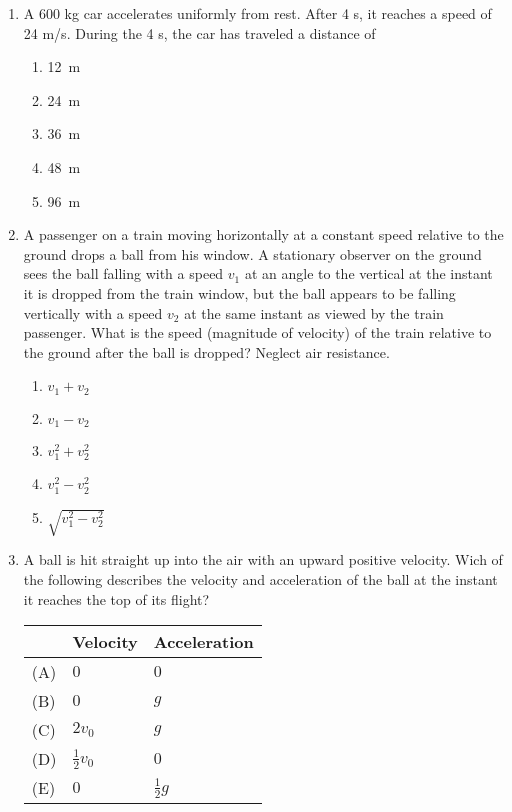 \documentclass{../../oss-apphys}
\begin{document}
\begin{multicols}{2}
\begin{enumerate}[resume,leftmargin=18pt]
    \item A 600 kg car accelerates uniformly from rest. After 4 s, it reaches a
      speed of 24 m/s. During the 4 s, the car has traveled a distance of
      \begin{enumerate}[noitemsep,topsep=0pt,leftmargin=18pt,label=(\Alph*)]
      \item\SI{12}{\metre}
      \item\SI{24}{\metre}
      \item\SI{36}{\metre}
      \item\SI{48}{\metre}
      \item\SI{96}{\metre}
      \end{enumerate}
      \columnbreak
      
    \item A passenger on a train moving horizontally at a constant speed
      relative to the ground drops a ball from his window. A stationary
      observer on the ground sees the ball falling with a speed $v_1$ at an
      angle to the vertical at the instant it is dropped from the train window,
      but the ball appears to be falling vertically with a speed $v_2$ at the
      same instant as viewed by the train passenger. What is the speed
      (magnitude of velocity) of the train relative to the ground after the
      ball is dropped? Neglect air resistance.
      \begin{enumerate}[noitemsep,topsep=0pt,leftmargin=18pt,label=(\Alph*)]
      \item $ v_1 + v_2$
      \item $ v_1 - v_2$
      \item $ v_1^2 + v_2^2$
      \item $ v_1^2 - v_2^2$
      \item $\sqrt{v_1^2 - v_2^2}$
      \end{enumerate}
      
    \item A ball is hit straight up into the air with an upward positive
      velocity. Wich of the following describes the velocity and acceleration
      of the ball at the instant it reaches the top of its flight?
      \begin{tabular}{lll}
        & Velocity & Acceleration\\ \hline
        (A) & $0$ & $0$\\
        (B) & $0$ & $g$\\
        (C) & $2v_0$ & $g$\\
        (D) & $\frac{1}{2}v_0$ & $0$\\
        (E) & $0$ & $\frac{1}{2}g$
      \end{tabular}
      

\end{enumerate}
\end{multicols}
\end{document}
